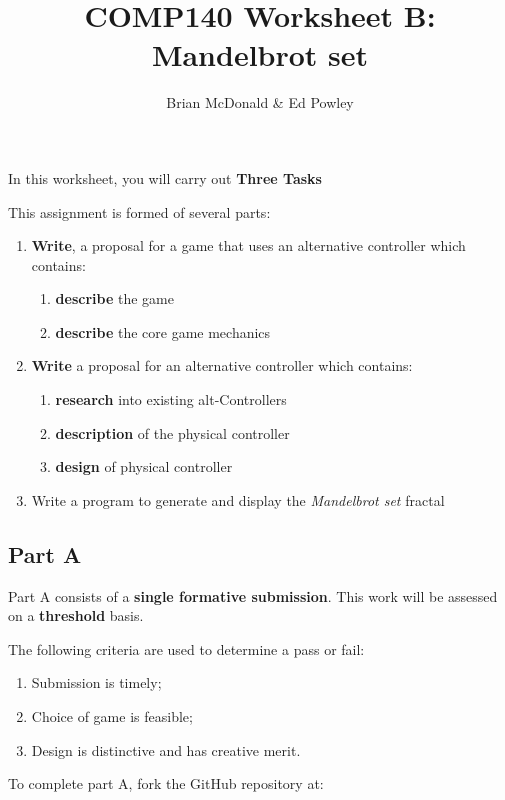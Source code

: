 \documentclass{../../../fal_assignment}
\title{COMP140 Worksheet B: Mandelbrot set}
\author{Brian McDonald \& Ed Powley}
\begin{document}
\maketitle

In this worksheet, you will carry out \textbf{Three Tasks}

This assignment is formed of several parts:

\begin{enumerate}[label=(\Alph*)]
	\item \textbf{Write}, a proposal for a game that uses an alternative controller which contains:
	\begin{enumerate}[label=\roman*.]
		\item \textbf{describe} the game
		\item \textbf{describe} the core game mechanics
	\end{enumerate}
	\item \textbf{Write} a proposal for an alternative controller which contains: 
	\begin{enumerate}[label=\roman*.]
		\item \textbf{research} into existing alt-Controllers
		\item \textbf{description} of the physical controller
		\item \textbf{design} of physical controller
	\end{enumerate}
	\item {Write} a program to generate and display the \emph{Mandelbrot set} fractal
\end{enumerate}


	\subsection*{Part A}

Part A consists of a \textbf{single formative submission}. This work will be assessed on a \textbf{threshold} basis. 

The following criteria are used to determine a pass or fail:

\begin{enumerate}[label=(\alph*)]
	\item Submission is timely;
	\item Choice of game is feasible;
	\item Design is distinctive and has creative merit.
\end{enumerate}

To complete part A, fork the GitHub repository at:
\end{document}
